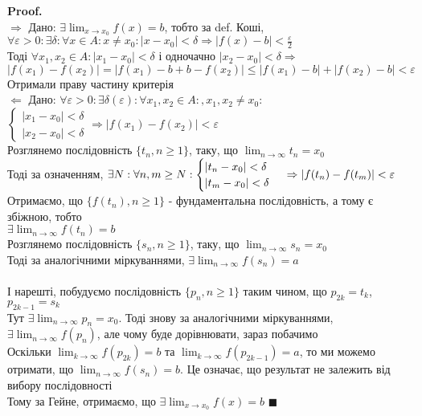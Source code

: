 \documentclass[a4paper, 14pt]{extarticle}
\def\huge{\displaystyle}
\def\bigline{\vspace{5mm}\\}
\def\rightproof{$\boxed{\Rightarrow}$ }
\def\leftproof{$\boxed{\Leftarrow}$ }
\theoremstyle{theoremdd}
\theoremstyle{theoremdd}
\theoremstyle{theoremdd}
\theoremstyle{theoremdd}
\theoremstyle{theoremdd}
\theoremstyle{theoremdd}
\theoremstyle{theoremdd}
\theoremstyle{theoremdd}
\newenvironment{pf}{\vspace*{-3mm} \textbf{Proof. \\}}{$\blacksquare$}
\begin{document}
\begin{pf}
\rightproof Дано: $\exists \huge \lim_{x \to x_0} f(x) = b$, тобто за def. Коші,\\
$\forall \varepsilon > 0: \exists \delta: \forall x \in A: x \neq x_0: |x-x_0|<\delta \Rightarrow |f(x)-b|< \huge \frac{\varepsilon}{2}$\\
Тоді $\forall x_1, x_2 \in A: |x_1 - x_0| < \delta$ і одночачно $|x_2 - x_0| < \delta \Rightarrow$\\
$|f(x_1)-f(x_2)| = |f(x_1)-b + b - f(x_2)| \leq |f(x_1) - b| + |f(x_2)-b| < \varepsilon$\\
Отримали праву частину критерія
\bigline

\leftproof Дано: $\forall \varepsilon > 0: \exists \delta(\varepsilon): \forall x_1,x_2 \in A:, x_1,x_2 \neq x_0:$
$\begin{cases} |x_1-x_0|<\delta \\ |x_2-x_0|<\delta \end{cases} \Rightarrow |f(x_1)-f(x_2)|<\varepsilon$\\
Розглянемо послідовність $\{t_n, n \geq 1\}$, таку, що $\huge \lim_{n \to \infty} t_n = x_0$\\
Тоді за означенням, $\exists N: \forall n,m \geq N: \begin{cases} |t_n-x_0|<\delta \\ |t_m-x_0|<\delta \end{cases} \\ \Rightarrow |f(t_n)-f(t_m)|<\varepsilon$\\
Отримаємо, що $\{f(t_n),n \geq 1\}$ - фундаментальна послідовність, а тому є збіжною, тобто\\
$\exists \huge \lim_{n \to \infty} f(t_n) = b$\\
Розглянемо послідовність $\{s_n, n \geq 1\}$, таку, що $\huge \lim_{n \to \infty} s_n = x_0$\\
Тоді за аналогічними міркуваннями, $\exists \huge \lim_{n \to \infty} f(s_n) = a$\\
\bigline
І нарешті, побудуємо послідовність $\{p_n, n \geq 1\}$ таким чином, що $p_{2k} = t_k$, $p_{2k-1} = s_k$\\
Тут $\exists \huge \lim_{n \to \infty} p_n = x_0$. Тоді знову за аналогічними міркуваннями, $\exists \huge \lim_{n \to \infty} f(p_n)$, але чому буде дорівнювати, зараз побачимо\\
Оскільки $\huge \lim_{k \to \infty} f(p_{2k}) = b$ та $\huge \lim_{k \to \infty} f(p_{2k-1}) = a$, то ми можемо отримати, що $\huge \lim_{n \to \infty} f(s_{n}) = b$. Це означає, що результат не залежить від вибору послідовності\\
Тому за Гейне, отримаємо, що $\exists \huge \lim_{x \to x_0} f(x) = b$
\end{pf}
\end{document}
